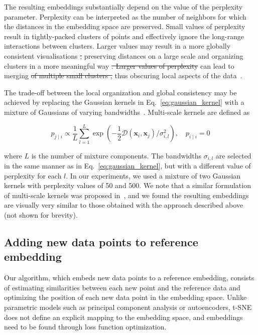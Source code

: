\documentclass[runningheads]{llncs}
\providecommand{\DIFadd}[1]{{\protect\color{blue}\uwave{#1}}} %
\providecommand{\DIFdel}[1]{{\protect\color{red}\sout{#1}}}                      %
\providecommand{\DIFaddbegin}{} %
\providecommand{\DIFaddend}{} %
\providecommand{\DIFdelbegin}{} %
\providecommand{\DIFdelend}{} %
\newcommand{\DIFscaledelfig}{0.5}
\newlength{\DIFdelgraphicswidth} %
\newlength{\DIFdelgraphicsheight} %
\newcommand{\DIFaddincludegraphics}[2][]{{\color{blue}\fbox{\DIFOincludegraphics[#1]{#2}}}} %
\newcommand{\DIFdelincludegraphics}[2][]{%
\sbox{\DIFdelgraphicsbox}{\DIFOincludegraphics[#1]{#2}}%
\settoboxwidth{\DIFdelgraphicswidth}{\DIFdelgraphicsbox} %
\settoboxtotalheight{\DIFdelgraphicsheight}{\DIFdelgraphicsbox} %
\scalebox{\DIFscaledelfig}{%
\parbox[b]{\DIFdelgraphicswidth}{\usebox{\DIFdelgraphicsbox}\\[-\baselineskip] \rule{\DIFdelgraphicswidth}{0em}}\llap{\resizebox{\DIFdelgraphicswidth}{\DIFdelgraphicsheight}{%
\setlength{\unitlength}{\DIFdelgraphicswidth}%
\begin{picture}(1,1)%
\thicklines\linethickness{2pt} %
{\color[rgb]{1,0,0}\put(0,0){\framebox(1,1){}}}%
{\color[rgb]{1,0,0}\put(0,0){\line( 1,1){1}}}%
{\color[rgb]{1,0,0}\put(0,1){\line(1,-1){1}}}%
\end{picture}%
}\hspace*{3pt}}} %
} %
\DeclareRobustCommand{\DIFaddbegin}{\DIFOaddbegin \let\includegraphics\DIFaddincludegraphics} %
\DeclareRobustCommand{\DIFaddend}{\DIFOaddend \let\includegraphics\DIFOincludegraphics} %
\DeclareRobustCommand{\DIFdelbegin}{\DIFOdelbegin \let\includegraphics\DIFdelincludegraphics} %
\DeclareRobustCommand{\DIFdelend}{\DIFOaddend \let\includegraphics\DIFOincludegraphics} %
\begin{document}
The resulting embeddings substantially depend on the value of the perplexity
parameter. Perplexity can be interpreted as the number of
neighbors for which the distances in the embedding space are preserved. Small
values of perplexity result in tightly-packed clusters of points and effectively
ignore the long-range interactions between clusters. Larger values may result
in a more globally consistent visualisations \DIFdelbegin \DIFdel{, }\DIFdelend \DIFaddbegin \DIFadd{--- }\DIFaddend preserving distances on a large
scale and organizing clusters in a more meaningful way \DIFdelbegin \DIFdel{. Larger values of
perplexity }\DIFdelend \DIFaddbegin \DIFadd{--- but }\DIFaddend can lead to merging 
\DIFdelbegin \DIFdel{of multiple small clusters , }\DIFdelend \DIFaddbegin \DIFadd{small clusters and }\DIFaddend thus obscuring local aspects of the data~\cite{art_of_using_tsne}.

The trade-off between the local organization and global consistency may be
achieved by replacing the Gaussian kernels in Eq.~\ref{eq:gaussian_kernel} with
a mixture of Gaussians of varying bandwidths~\cite{multiscale_tsne}.
Multi-scale kernels are defined as

\begin{equation}
p_{j \mid i} \propto \frac{1}{L} \sum_{l=1}^{L} \exp \left ( - \frac{1}{2} \mathcal{D}(\mathbf{x}_i, \mathbf{x}_j ) / \sigma_{i,l}^2 \right ), \quad p_{i \mid i} = 0
\label{eq:multiscale}
\end{equation}

\noindent where $L$ is the number of mixture components. The bandwidths
$\sigma_{i,l}$ are selected in the same manner as in
Eq.~\ref{eq:gaussian_kernel}, but with a different value of perplexity for each
$l$. In our experiments, we used a mixture of two Gaussian kernels with
perplexity values of 50 and 500. We note that a similar formulation of
multi-scale kernels was proposed in~\cite{art_of_using_tsne}, and we found the
resulting embeddings are visually very similar to those obtained with the
approach described above (not shown for brevity).


\subsection{Adding new data points to reference embedding\label{sec:transfer}}

Our algorithm, which embeds new data points to a reference embedding, consists of
estimating similarities between each new point and the reference data and optimizing
the position of each new data point in the embedding space. Unlike parametric models
such as principal component analysis or autoencoders, t-SNE does not define an
explicit mapping to the embedding space, and embeddings need to be found through
loss function optimization.
\end{document}
